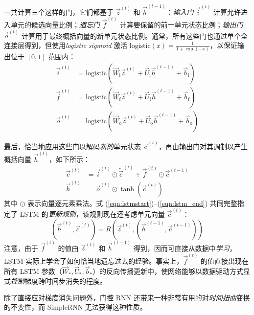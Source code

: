 一共计算三个这样的门，它们都基于 $\vec{z}^{(t)}$ 和 $\vec{h}^{(t-1)}$：\emph{输入门} $\vec{i}^{(t)}$ 计算允许进入单元的候选向量比例；\emph{遗忘门} $\vec{f}^{(t)}$ 计算要保留的前一单元状态比例；\emph{输出门} $\vec{o}^{(t)}$ 计算用于最终概括向量的新单元状态比例。通常，所有这些门也通过单个全连接层得到，但使用\emph{logistic sigmoid} 激活 $\mathrm{logistic}(x) = \frac{1}{1+\exp(-x)}$，以保证输出位于 $[0, 1]$ 范围内：
\begin{align}\label{eqn:lstm_gate}
     \vec{i}^{(t)} &= \mathrm{logistic}(\vec{W}_\mathrm{i}\vec{z}^{(t)} + \vec{U}_\mathrm{i}\vec{h}^{(t-1)} + \vec{b}_\mathrm{i})\\
     \vec{f}^{(t)} &= \mathrm{logistic}(\vec{W}_\mathrm{f}\vec{z}^{(t)} + \vec{U}_\mathrm{f}\vec{h}^{(t-1)} + \vec{b}_\mathrm{f})\\
     \vec{o}^{(t)} &= \mathrm{logistic}(\vec{W}_\mathrm{o}\vec{z}^{(t)} + \vec{U}_\mathrm{o}\vec{h}^{(t-1)} + \vec{b}_\mathrm{o})
\end{align}

最后，恰当地应用这些门以解码\emph{新的}单元状态 $\vec{c}^{(t)}$，再由输出门对其调制以产生概括向量 $\vec{h}^{(t)}$，如下所示：
\begin{align}
    \vec{c}^{(t)} &= \vec{i}^{(t)}\odot\widetilde{\vec{c}}^{(t)} + \vec{f}^{(t)}\odot\vec{c}^{(t-1)}\\
    \vec{h}^{(t)} &= \vec{o}^{(t)}\odot\tanh(\vec{c}^{(t)})\label{eqn:lstm_end}
\end{align}
其中 $\odot$ 表示向量逐元素乘法。式 (\ref{eqn:lstmstart})--(\ref{eqn:lstm_end}) 共同完整指定了 LSTM 的\emph{更新规则}，该规则现在还考虑单元向量 $\vec{c}^{(t)}$：
$$
    (\vec{h}^{(t)}, \vec{c}^{(t)}) = R(\vec{z}^{(t)}, (\vec{h}^{(t-1)}, \vec{c}^{(t-1)}))
$$
注意，由于 $\vec{f}^{(t)}$ 的值由 $\vec{z}^{(t)}$ 和 $\vec{h}^{(t-1)}$ 得到，因而可直接从数据中\emph{学习}，LSTM 实际上学会了如何恰当地遗忘过去的经验。事实上，$\vec{f}^{(t)}$ 的值直接出现在所有 LSTM 参数（$\vec{W}_*, \vec{U}_*, \vec{b}_*$）的反向传播更新中，使网络能够以数据驱动方式显式\emph{控制}梯度跨时间步消失的程度。

除了直接应对梯度消失问题外，门控 RNN 还带来一种非常有用的对\emph{时间扭曲}变换的不变性，而 SimpleRNN 无法获得这种性质。

